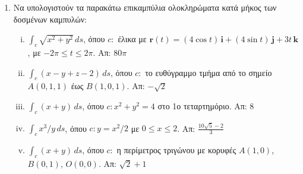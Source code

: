




\pagestyle{askhseis}
\everymath{\displaystyle}



\begin{center}
\minibox{\large\bfseries \textcolor{Col1}{Επικαμπύλιο Ολοκλήρωμα Ιου είδους}}
\end{center}

\vspace{\baselineskip}


\begin{enumerate}
  \item Να υπολογιστούν τα παρακάτω επικαμπύλια ολοκληρώματα κατά μήκος των 
    δοσμένων καμπυλών:
    \begin{enumerate}[i)]


      \item $ \int _{c} \sqrt{x^{2}+y^{2}} \,{ds} $, όπου $ c \colon $ έλικα με 
        $ \mathbf{r}(t)=(4 \cos{t} )\, \mathbf{i} + (4 \sin{t})\, \mathbf{j} + 3t \, 
        \mathbf{k} $, με $ -2 \pi \leq t \leq 2 \pi $.  
        \hfill Απ: $80 \pi$ 
      \item $ \int _{c} (x-y+z-2) \,{ds} $, όπου $ c \colon $ το ευθύγραμμο τμήμα 
        από το σημείο $ A(0,1,1) $ έως $ B(1,0,1) $.
        \hfill Απ: $ -\sqrt{2} $ 


      \item $ \int _{c} (x+y) \,{ds} $, όπου $ c \colon x^{2}+y^{2}=4 $ στο 1ο
        τεταρτημόριο.  \hfill Απ: $8$ 
      \item $ \int _{c} x^{3}/y \,{ds} $, όπου $ c \colon y=x^{2}/2 $ με 
        $0 \leq x \leq 2$.  
        \hfill Απ: $ \frac{10 \sqrt{5} -2}{3} $ 
      \item $ \int _{c} (x+y) \,{ds} $, όπου $ c \colon $ η περίμετρος τριγώνου 
        με κορυφές $ A(1,0) $, $ B(0,1) $, $ O(0,0) $.
        \hfill Απ: $ \sqrt{2} +1 $ 


\end{enumerate}
\end{enumerate}
